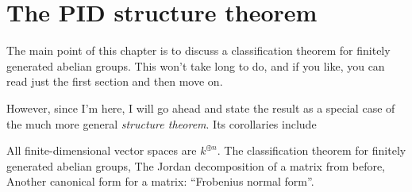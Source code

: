 \chapter{The PID structure theorem}
The main point of this chapter is to discuss a classification
theorem for finitely generated abelian groups.
This won't take long to do, and if you like, you can read
just the first section and then move on.

However, since I'm here, I will go ahead and state the result as a
special case of the much more general \emph{structure theorem}.
Its corollaries include
\begin{itemize}
	\ii All finite-dimensional vector spaces are $k^{\oplus n}$.
	\ii The classification theorem for finitely generated abelian groups,
	\ii The Jordan decomposition of a matrix from before,
	\ii Another canonical form for a matrix: ``Frobenius normal form''.
\end{itemize}

